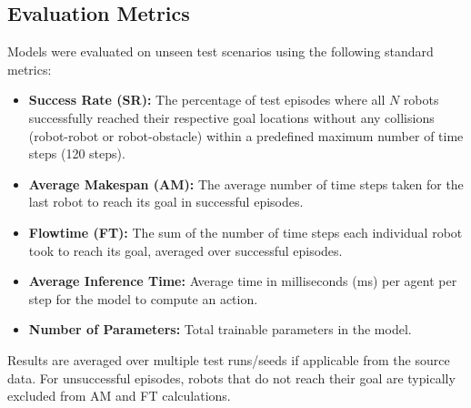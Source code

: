 \subsection{Evaluation Metrics}
\label{subsec:evaluation_metrics}
Models were evaluated on unseen test scenarios using the following standard metrics:
\begin{itemize}
    \item \textbf{Success Rate (SR):} The percentage of test episodes where all $N$ robots successfully reached their respective goal locations without any collisions (robot-robot or robot-obstacle) within a predefined maximum number of time steps (120 steps).
    \item \textbf{Average Makespan (AM):} The average number of time steps taken for the last robot to reach its goal in successful episodes.
    \item \textbf{Flowtime (FT):} The sum of the number of time steps each individual robot took to reach its goal, averaged over successful episodes.
    \item \textbf{Average Inference Time:} Average time in milliseconds (ms) per agent per step for the model to compute an action.
    \item \textbf{Number of Parameters:} Total trainable parameters in the model.
\end{itemize}
Results are averaged over multiple test runs/seeds if applicable from the source data. For unsuccessful episodes, robots that do not reach their goal are typically excluded from AM and FT calculations.

